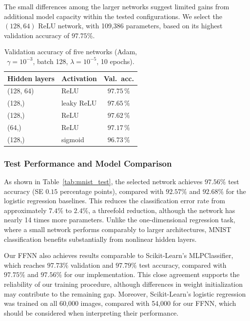 \documentclass[amssymb,twocolumn,aps]{revtex4}
\begin{document}
The small differences among the larger networks suggest limited gains from additional model capacity within the tested configurations. We select the $(128,64)$ ReLU network, with 109,386 parameters, based on its highest validation accuracy of $97.75\%$.

\begin{table}[h]
\centering
\begin{tabular}{llc}
\hline
\textbf{Hidden layers} & \textbf{Activation} & \textbf{Val.\ acc.} \\
\hline
(128, 64) & ReLU & $97.75\,\%$ \\
(128,) & leaky ReLU & $97.65\,\%$ \\
(128,) & ReLU & $97.62\,\%$ \\
(64,) & ReLU & $97.17\,\%$ \\
(128,) & sigmoid & $96.73\,\%$ \\
\hline
\end{tabular}
\caption{Validation accuracy of five networks (Adam, $\gamma=10^{-3}$, batch 128, $\lambda=10^{-5}$, 10 epochs).}
\label{tab:e}
\end{table}

\subsubsection{Test Performance and Model Comparison}
As shown in Table~\ref{tab:mnist_test}, the selected network achieves $97.56\%$ test accuracy (SE $0.15$ percentage points), compared with $92.57\%$ and $92.68\%$ for the logistic regression baselines. This reduces the classification error rate from approximately $7.4\%$ to $2.4\%$, a threefold reduction, although the network has nearly 14 times more parameters. Unlike the one-dimensional regression task, where a small network performs comparably to larger architectures, MNIST classification benefits substantially from nonlinear hidden layers. 

Our FFNN also achieves results comparable to Scikit-Learn's MLPClassifier, which reaches $97.73\%$ validation and $97.79\%$ test accuracy, compared with $97.75\%$ and $97.56\%$ for our implementation. This close agreement supports the reliability of our training procedure, although differences in weight initialization may contribute to the remaining gap. Moreover, Scikit-Learn's logistic regression was trained on all 60,000 images, compared with 54,000 for our FFNN, which should be considered when interpreting their performance.
\end{document}

